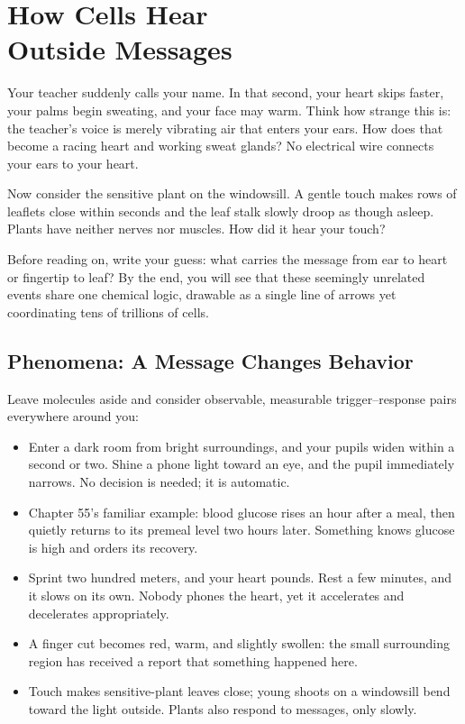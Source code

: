 \chapter[How Cells Hear Outside Messages]{How Cells Hear\protect\\ Outside Messages}

\begin{kaichang}
Your teacher suddenly calls your name. In that second, your heart skips faster, your palms begin sweating, and your face may warm. Think how strange this is: the teacher's voice is merely vibrating air that enters your ears. How does that become a racing heart and working sweat glands? No electrical wire connects your ears to your heart.

Now consider the sensitive plant on the windowsill. A gentle touch makes rows of leaflets close within seconds and the leaf stalk slowly droop as though asleep. Plants have neither nerves nor muscles. How did it hear your touch?

Before reading on, write your guess: what carries the message from ear to heart or fingertip to leaf? By the end, you will see that these seemingly unrelated events share one chemical logic, drawable as a single line of arrows yet coordinating tens of trillions of cells.
\end{kaichang}

\section{Phenomena: A Message Changes Behavior}

Leave molecules aside and consider observable, measurable trigger--response pairs everywhere around you:

\begin{itemize}[itemsep=2pt]
\item Enter a dark room from bright surroundings, and your pupils widen within a second or two. Shine a phone light toward an eye, and the pupil immediately narrows. No decision is needed; it is automatic.
\item Chapter 55's familiar example: blood glucose rises an hour after a meal, then quietly returns to its premeal level two hours later. Something knows glucose is high and orders its recovery.
\item Sprint two hundred meters, and your heart pounds. Rest a few minutes, and it slows on its own. Nobody phones the heart, yet it accelerates and decelerates appropriately.
\item A finger cut becomes red, warm, and slightly swollen: the small surrounding region has received a report that something happened here.
\item Touch makes sensitive-plant leaves close; young shoots on a windowsill bend toward the light outside. Plants also respond to messages, only slowly.
\end{itemize}

